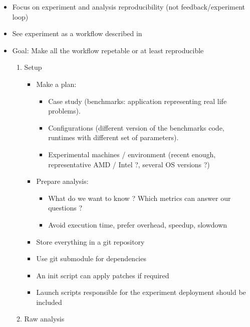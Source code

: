 \begin{itemize}
    \item Focus on experiment and analysis reproducibility (not
        feedback/experiment loop)
    \item See experiment as a workflow described in 
    \item Goal: Make all the workflow repetable or at least reproducible
        \begin{enumerate}
            \item Setup
                \begin{itemize}
                    \item Make a plan:
                        \begin{itemize}
                            \item Case study (benchmarks: application representing real life
                                problems).
                            \item Configurations (different version of the benchmarks code,
                                runtimes with different set of parameters).
                            \item Experimental machines / environment (recent enough,
                                representative AMD / Intel ?, several OS versions ?)
                        \end{itemize}
                    \item Prepare analysis:
                        \begin{itemize}
                            \item What do we want to know ? Which metrics can answer our
                                questions ?
                            \item Avoid execution time, prefer overhead, speedup, slowdown
                        \end{itemize}
                    \item Store everything in a git repository
                    \item Use git submodule for dependencies
                    \item An init script can apply patches if required
                    \item Launch scripts responsible for the experiment
                        deployment should be included
                \end{itemize}
            \item Raw analysis

\end{enumerate}
\end{itemize}
